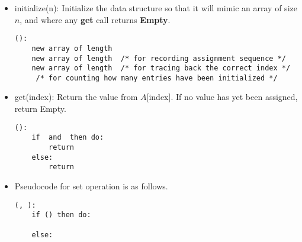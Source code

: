 \documentclass{letter}
\newcommand{\tmstrong}[1]{\textbf{#1}}
\newenvironment{itemizedot}{\begin{itemize} \renewcommand{\labelitemi}{$\bullet$}\renewcommand{\labelitemii}{$\bullet$}\renewcommand{\labelitemiii}{$\bullet$}\renewcommand{\labelitemiv}{$\bullet$}}{\end{itemize}}
\begin{document}
\begin{itemizedot}
  \item initialize(n): Initialize the data structure so that it will mimic an
  array of size $n$, and where any {\tmstrong{get}} call returns
  {\tmstrong{Empty}}.
  
  \begin{verbatim}
():
    new array of length 
    new array of length  /* for recording assignment sequence */
    new array of length  /* for tracing back the correct index */
     /* for counting how many entries have been initialized */
\end{verbatim}
  
  \item get(index): Return the value from $A$[index]. If no value has yet been
  assigned, return Empty.
  
  \begin{verbatim}
():
    if  and  then do:
        return 
    else:
        return 
\end{verbatim}
  
  \item Pseudocode for set operation is as follows.
  
  \begin{verbatim}
(, ):
    if () then do:
        
    else:
        
        
        
        
\end{verbatim}
\end{itemizedot}
\end{document}

